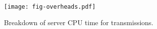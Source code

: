 \begin{figure}[t]
\texttt{[image: fig-overheads.pdf]}
\caption{Breakdown of server CPU time for transmissions.}
\label{fig:overheads}
\end{figure}
